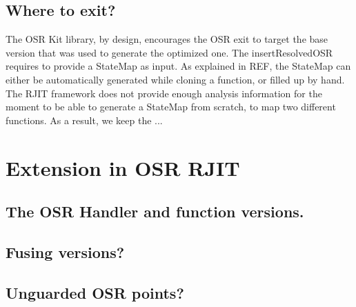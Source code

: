  
\subsection{Where to exit?}
The OSR Kit library, by design, encourages the OSR exit to target the base version that was used to generate the optimized one.
The insertResolvedOSR requires to provide a StateMap as input.
As explained in REF, the StateMap can either be automatically generated while cloning a function, or filled up by hand. 
The RJIT framework does not provide enough analysis information for the moment to be able to generate a StateMap from scratch, to map two different functions.
As a result, we keep the ...

\section{Extension in OSR RJIT}\label{extendingOSR}

\subsection{The OSR Handler and function versions.}

\subsection{Fusing versions?}


\subsection{Unguarded OSR points?}

